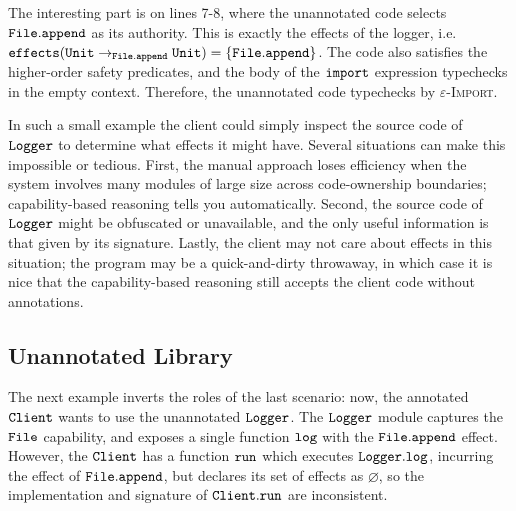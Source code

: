 The interesting part  is on lines 7-8, where the unannotated code selects $\mathtt{File.append}$ as its authority. This is exactly the effects of the logger, i.e. $\mathtt{effects}(\mathtt{Unit} \rightarrow_{\mathtt{File.append}} \mathtt{Unit}) = \{ \mathtt{File.append} \}$. The code also satisfies the higher-order safety predicates, and the body of the $\mathtt{import}$ expression typechecks in the empty context. Therefore, the unannotated code typechecks by \textsc{$\varepsilon$-Import}.

In such a small example the client could simply inspect the source code of $\mathtt{Logger}$ to determine what effects it might have. Several situations can make this impossible or tedious. First, the manual approach loses efficiency when the system involves many modules of large size across code-ownership boundaries; capability-based reasoning tells you automatically. Second, the source code of $\mathtt{Logger}$ might be obfuscated or unavailable, and the only useful information is that given by its signature. Lastly, the client may not care about effects in this situation; the program may be a quick-and-dirty throwaway, in which case it is nice that the capability-based reasoning still accepts the client code without annotations.











































\subsection{Unannotated Library}

The next example inverts the roles of the last scenario: now, the annotated $\mathtt{Client}$ wants to use the unannotated $\mathtt{Logger}$. The $\mathtt{Logger}$ module captures the $\mathtt{File}$ capability, and exposes a single function $\mathtt{log}$ with the $\mathtt{File.append}$ effect. However, the $\mathtt{Client}$ has a function $\mathtt{run}$ which executes $\mathtt{Logger.log}$, incurring the effect of $\mathtt{File.append}$, but declares its set of effects as $\varnothing$, so the implementation and signature of $\mathtt{Client.run}$ are inconsistent.


